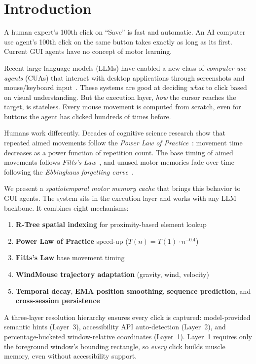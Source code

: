 \documentclass[conference]{IEEEtran}
\begin{document}
\section{Introduction}

A human expert's 100th click on ``Save'' is fast and automatic. An AI computer use agent's 100th click on the same button takes exactly as long as its first. Current GUI agents have no concept of motor learning.

Recent large language models (LLMs) have enabled a new class of \emph{computer use agents} (CUAs) that interact with desktop applications through screenshots and mouse/keyboard input~\cite{anthropic2024computer,openai2025operator,zhang2024ufo}. These systems are good at deciding \emph{what} to click based on visual understanding. But the execution layer, \emph{how} the cursor reaches the target, is stateless. Every mouse movement is computed from scratch, even for buttons the agent has clicked hundreds of times before.

Humans work differently. Decades of cognitive science research show that repeated aimed movements follow the \emph{Power Law of Practice}~\cite{newell1981}: movement time decreases as a power function of repetition count. The base timing of aimed movements follows \emph{Fitts's Law}~\cite{fitts1954}, and unused motor memories fade over time following the \emph{Ebbinghaus forgetting curve}~\cite{ebbinghaus1885}.

We present a \emph{spatiotemporal motor memory cache} that brings this behavior to GUI agents. The system sits in the execution layer and works with any LLM backbone. It combines eight mechanisms:

\begin{enumerate}[noitemsep,topsep=0pt]
    \item \textbf{R-Tree spatial indexing} for proximity-based element lookup
    \item \textbf{Power Law of Practice} speed-up ($T(n) = T(1) \cdot n^{-0.4}$)
    \item \textbf{Fitts's Law} base movement timing
    \item \textbf{WindMouse trajectory adaptation} (gravity, wind, velocity)
    \item \textbf{Temporal decay}, \textbf{EMA position smoothing}, \textbf{sequence prediction}, and \textbf{cross-session persistence}
\end{enumerate}

A three-layer resolution hierarchy ensures every click is captured: model-provided semantic hints (Layer~3), accessibility API auto-detection (Layer~2), and percentage-bucketed window-relative coordinates (Layer~1). Layer~1 requires only the foreground window's bounding rectangle, so \emph{every} click builds muscle memory, even without accessibility support.
\end{document}
